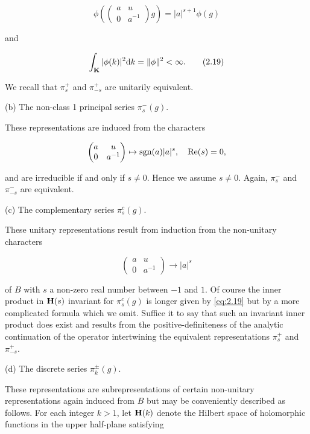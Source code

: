 \begin{equation}\label{eq:2.18}
\phi\left(\begin{pmatrix} a & u \\ 0 & a^{-1} \end{pmatrix} g\right) = |a|^{s+1}\phi(g)\tag{2.18}
\end{equation}

and

\begin{equation}\label{eq:2.19}
\int_{\mathbf{K}} |\phi(k)|^2 \mathrm{d} k = \|\phi\|^2 < \infty.\tag{2.19}
\end{equation}

We recall that $\pi_s^{+}$ and $\pi_{-s}^{+}$ are unitarily equivalent.

(b) The non-class 1 principal series $\pi_s^{-}(g)$.

These representations are induced from the characters

\[
\begin{pmatrix} a & u \\ 0 & a^{-1} \end{pmatrix} \mapsto \operatorname{sgn}(a)|a|^{s}, \quad \operatorname{Re}(s) = 0,
\]

and are irreducible if and only if $s \neq 0$. Hence we assume $s \neq 0$. Again, $\pi_s^{-}$ and $\pi_{-s}^{-}$ are equivalent.

(c) The complementary series $\pi_s^{c}(g)$.

These unitary representations result from induction from the non-unitary characters

\[
\begin{pmatrix} a & u \\ 0 & a^{-1} \end{pmatrix} \to |a|^{s}
\]

of $B$ with $s$ a non-zero real number between $-1$ and $1$. Of course the inner product in $\mathbf{H}(s)$ invariant for $\pi_s^{c}(g)$ is longer given by \eqref{eq:2.19} but by a more complicated formula which we omit. Suffice it to say that such an invariant inner product does exist and results from the positive-definiteness of the analytic continuation of the operator intertwining the equivalent representations $\pi_s^{+}$ and $\pi_{-s}^{+}$.

(d) The discrete series $\pi_k^{\pm}(g)$.

These representations are subrepresentations of certain non-unitary representations again induced from $B$ but may be conveniently described as follows. For each integer $k > 1$, let $\mathbf{H}(k)$ denote the Hilbert space of holomorphic functions in the upper half-plane satisfying

